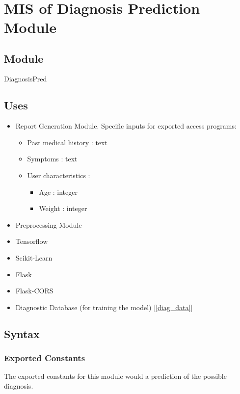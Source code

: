 \documentclass[12pt, titlepage]{article}
\begin{document}
\newpage
~\newpage
 

\section{MIS of Diagnosis Prediction Module} \label{diag_pred_mod}

\subsection{Module}

DiagnosisPred

\subsection{Uses}
\begin{itemize}
  \item Report Generation Module. Specific inputs for exported access programs:
    \begin{itemize}
      \item Past medical history : text
      \item Symptoms : text
      \item User characteristics :
        \begin{itemize}
          \item Age : integer
          \item Weight : integer
        \end{itemize}
    \end{itemize}
  \item Preprocessing Module
  \item Tensorflow
  \item Scikit-Learn
  \item Flask
  \item Flask-CORS
  \item Diagnostic Database (for training the model) [\ref{diag_data}]
\end{itemize}

\subsection{Syntax}

\subsubsection{Exported Constants}
The exported constants for this module would a prediction of the possible diagnosis.
\end{document}
